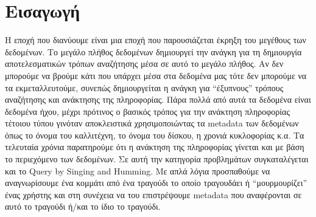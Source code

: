 \section{Εισαγωγή}
Η εποχή που διανύουμε είναι μια εποχή που παρουσιάζεται έκρηξη του μεγέθους των
δεδομένων. Το μεγάλο πλήθος δεδομένων δημιουργεί την ανάγκη για τη δημιουργία
αποτελεσματικών τρόπων αναζήτησης μέσα σε αυτό το μεγάλο πλήθος. Αν δεν
μπορούμε να βρούμε κάτι που υπάρχει μέσα στα δεδομένα μας τότε δεν μπορούμε να
τα εκμεταλλευτούμε, συνεπώς δημιουργείται η ανάγκη για “έξυπνους” τρόπους
αναζήτησης και ανάκτησης της πληροφορίας. Πάρα πολλά από αυτά τα δεδομένα
είναι δεδομένα ήχου, μέχρι πρότινος ο βασικός τρόπος για την ανάκτηση
πληροφορίας τέτοιου τύπου γινόταν αποκλειστικά χρησιμοποιώντας τα metadata
των δεδομένων όπως το όνομα του καλλιτέχνη, το όνομα του δίσκου, η χρονιά
κυκλοφορίας κ.α. Τα τελευταία χρόνια παρατηρούμε ότι η ανάκτηση της πληροφορίας
 γίνεται και με βάση το περιεχόμενο των δεδομένων. Σε αυτή την κατηγορία
 προβλημάτων συγκαταλέγεται και το Query by Singing and Humming. Με απλά λόγια
 προσπαθούμε να αναγνωρίσουμε ένα κομμάτι από ένα τραγούδι το οποίο τραγουδάει
 ή “μουρμουρίζει” ένας χρήστης και στη συνέχεια να του επιστρέψουμε metadata
 που αναφέρονται σε αυτό το τραγούδι ή/και το ίδιο το τραγούδι.
